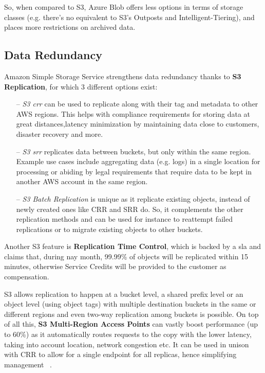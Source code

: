 So, when compared to S3, Azure Blob offers less options in terms of storage classes (e.g. there's no equivalent to S3's Outposts and Intelligent-Tiering), and places more restrictions on archived data.

\subsection{Data Redundancy}
Amazon Simple Storage Service strengthens data redundancy thanks to \textbf{S3 Replication}, for which 3 different options exist: ~\cite{s3replication}
\begin{itemize}
    \item [--] \textit{S3 \ac{crr}} can be used to replicate along with their tag and metadata to other AWS regions. This helps with compliance requirements for storing data at great distances,latency minimization by maintaining data close to customers, disaster recovery and more.

    \item [--] \textit{S3 \ac{srr}} replicates data between buckets, but only within the same region. Example use cases include aggregating data (e.g. logs) in a single location for processing or abiding by legal requirements that require data to be kept in another AWS account in the same region.

    \item [--] \textit{S3 Batch Replication} is unique as it replicate existing objects, instead of newly created ones like CRR and SRR do. So, it complements the other replication methods and can be used for instance to reattempt failed replications or to migrate existing objects to other buckets.
\end{itemize}

Another S3 feature is \textbf{Replication Time Control}, which is backed by a \ac{sla} and claims that, during nay month, 99.99\% of objects will be replicated within 15 minutes, otherwise Service Credits will be provided to the customer as compensation.~\cite{s3replicationsla}

S3 allows replication to happen at a bucket level, a shared prefix level or an object level (using object tags) with multiple destination buckets in the same or different regions and even two-way replication among buckets is possible. On top of all this, \textbf{S3 Multi-Region Access Points} can vastly boost performance (up to 60\%) as it automatically routes requests to the copy with the lower latency, taking into account location,  network congestion etc. It can be used in unison with CRR to allow for a single endpoint for all replicas, hence simplifying management  ~\cite{s3replication}.

